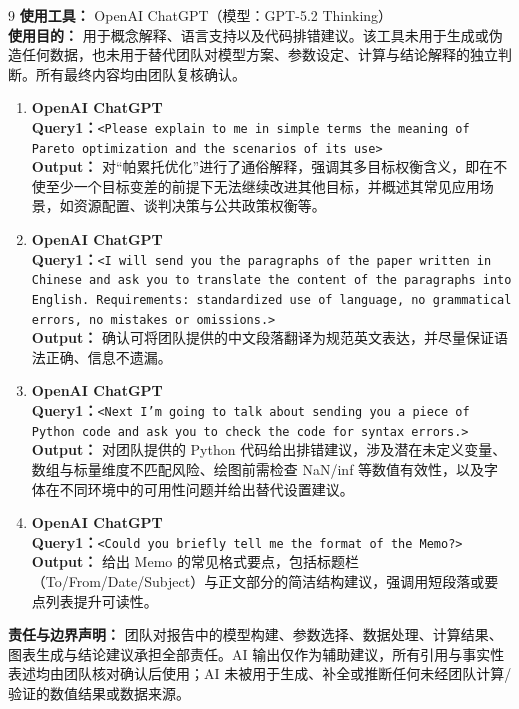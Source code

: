 \documentclass{mcmthesis}
\begin{document}
\begin{ReportAiUse}{9}
\noindent \textbf{使用工具：} OpenAI ChatGPT（模型：GPT-5.2 Thinking）\\
\textbf{使用目的：} 用于概念解释、语言支持以及代码排错建议。该工具未用于生成或伪造任何数据，也未用于替代团队对模型方案、参数设定、计算与结论解释的独立判断。所有最终内容均由团队复核确认。

\vspace{4pt}
\begin{enumerate}
  \item \textbf{OpenAI ChatGPT}\\
  \textbf{Query1：}\texttt{<Please explain to me in simple terms the meaning of Pareto optimization and the scenarios of its use>}\\
  \textbf{Output：} 对“帕累托优化”进行了通俗解释，强调其多目标权衡含义，即在不使至少一个目标变差的前提下无法继续改进其他目标，并概述其常见应用场景，如资源配置、谈判决策与公共政策权衡等。

  \item \textbf{OpenAI ChatGPT}\\
  \textbf{Query1：}\texttt{<I will send you the paragraphs of the paper written in Chinese and ask you to translate the content of the paragraphs into English. Requirements: standardized use of language, no grammatical errors, no mistakes or omissions.>}\\
  \textbf{Output：} 确认可将团队提供的中文段落翻译为规范英文表达，并尽量保证语法正确、信息不遗漏。

  \item \textbf{OpenAI ChatGPT}\\
  \textbf{Query1：}\texttt{<Next I’m going to talk about sending you a piece of Python code and ask you to check the code for syntax errors.>}\\
  \textbf{Output：} 对团队提供的 Python 代码给出排错建议，涉及潜在未定义变量、数组与标量维度不匹配风险、绘图前需检查 NaN/inf 等数值有效性，以及字体在不同环境中的可用性问题并给出替代设置建议。

  \item \textbf{OpenAI ChatGPT}\\
  \textbf{Query1：}\texttt{<Could you briefly tell me the format of the Memo?>}\\
  \textbf{Output：} 给出 Memo 的常见格式要点，包括标题栏（To/From/Date/Subject）与正文部分的简洁结构建议，强调用短段落或要点列表提升可读性。
\end{enumerate}

\vspace{4pt}
\noindent \textbf{责任与边界声明：} 团队对报告中的模型构建、参数选择、数据处理、计算结果、图表生成与结论建议承担全部责任。AI 输出仅作为辅助建议，所有引用与事实性表述均由团队核对确认后使用；AI 未被用于生成、补全或推断任何未经团队计算/验证的数值结果或数据来源。

\end{ReportAiUse}
\end{document}
